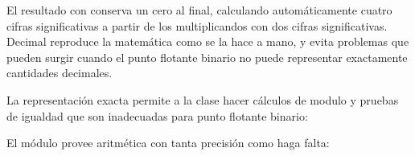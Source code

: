 \documentclass[a4,10pt,spanish]{sphinxmanual}
\begin{document}
\sphinxAtStartPar
El resultado con  conserva un cero al final, calculando automáticamente cuatro cifras significativas a partir de los multiplicandos con dos cifras significativas.  Decimal reproduce la matemática como se la hace a mano, y evita problemas que pueden surgir cuando el punto flotante binario no puede representar exactamente cantidades decimales.

\sphinxAtStartPar
La representación exacta permite a la clase  hacer cálculos de modulo y pruebas de igualdad que son inadecuadas para punto flotante binario:

\begin{sphinxVerbatim}[commandchars=\\\{\}]
  
  

\PYG{p}{[}\PYG{p}{]}  
\PYG{p}{[}\PYG{p}{]}  
\end{sphinxVerbatim}

\sphinxAtStartPar
El módulo  provee aritmética con tanta precisión como haga falta:

\begin{sphinxVerbatim}[commandchars=\\\{\}]
  
  
\end{sphinxVerbatim}
\end{document}
